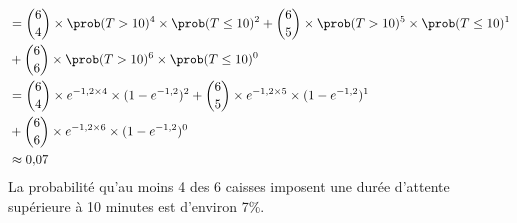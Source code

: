 {\begin{enumerate}
{\begin{align*}
			                &= \binom{6}{4} \times \prob(T > 10)^4 \times \prob(T \leq 10)^2 + \binom{6}{5} \times \prob(T > 10)^5 \times \prob(T \leq 10)^1 \\
			                &+ \binom{6}{6} \times \prob(T > 10)^6 \times \prob(T \leq 10)^0 \\
			                &= \binom{6}{4} \times e^{-1{,}2 \times 4} \times (1 - e^{-1{,}2})^2 + \binom{6}{5} \times e^{-1{,}2 \times 5} \times (1 - e^{-1{,}2})^1\\
			                 &+ \binom{6}{6} \times e^{-1{,}2 \times 6} \times (1 - e^{-1{,}2})^0 \\
			                &\approx 0{,}07
		\end{align*}
		La probabilité qu'au moins 4 des 6 caisses imposent une durée d'attente supérieure à 10 minutes est d'environ 7\%.
	}
\end{enumerate}
}
